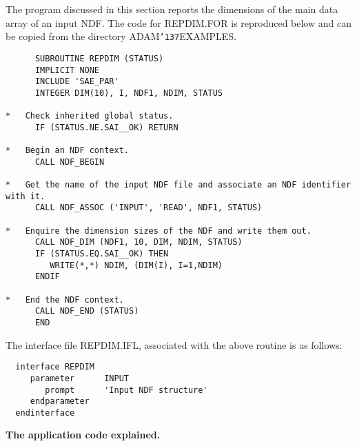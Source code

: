 \documentclass[twoside,11pt]{article}
\renewcommand{\_}{{\tt\char'137}}
\begin{document}
The program discussed in this section reports the
dimensions of the main data array of an input NDF.
The code for REPDIM.FOR is reproduced below and can be copied from the
directory ADAM\_EXAMPLES.
\begin{verbatim}
      SUBROUTINE REPDIM (STATUS)
      IMPLICIT NONE
      INCLUDE 'SAE_PAR'                                       
      INTEGER DIM(10), I, NDF1, NDIM, STATUS

*   Check inherited global status.
      IF (STATUS.NE.SAI__OK) RETURN

*   Begin an NDF context.    
      CALL NDF_BEGIN                                          
                                                              
*   Get the name of the input NDF file and associate an NDF identifier with it.
      CALL NDF_ASSOC ('INPUT', 'READ', NDF1, STATUS)
                                                              
*   Enquire the dimension sizes of the NDF and write them out.
      CALL NDF_DIM (NDF1, 10, DIM, NDIM, STATUS)
      IF (STATUS.EQ.SAI__OK) THEN
         WRITE(*,*) NDIM, (DIM(I), I=1,NDIM)
      ENDIF

*   End the NDF context.                                       
      CALL NDF_END (STATUS)                                  
      END                 
\end{verbatim}

The interface file REPDIM.IFL, associated with the above routine is
as follows:
\begin{verbatim}
  interface REPDIM
     parameter      INPUT
        prompt      'Input NDF structure'
     endparameter
  endinterface
\end{verbatim}


{\large\bf The application code explained.}
\end{document}
